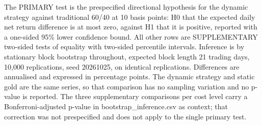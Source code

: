 \begin{table}[htbp]
\begin{tabular}{lrrrrrrrr}
\bottomrule
\end{tabular}
\begin{minipage}{\linewidth}\footnotesize The PRIMARY test is the prespecified directional hypothesis for the dynamic strategy against traditional 60/40 at 10 basis points: H0 that the expected daily net return difference is at most zero, against H1 that it is positive, reported with a one-sided 95\% lower confidence bound. All other rows are SUPPLEMENTARY two-sided tests of equality with two-sided percentile intervals. Inference is by stationary block bootstrap throughout, expected block length 21 trading days, 10{,}000 replications, seed 20261025, on identical replications. Differences are annualised and expressed in percentage points. The dynamic strategy and static gold are the same series, so that comparison has no sampling variation and no p-value is reported. The three supplementary comparisons per cost level carry a Bonferroni-adjusted p-value in bootstrap\_inference.csv as context; that correction was not prespecified and does not apply to the single primary test.\end{minipage}
\end{table}
